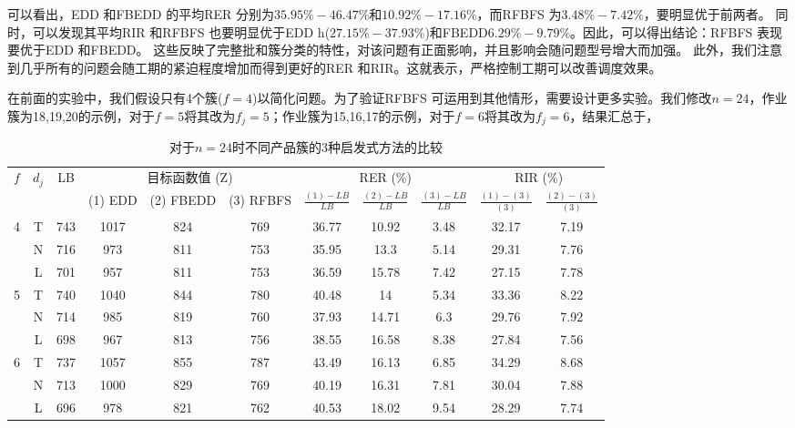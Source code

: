 可以看出，EDD 和FBEDD 的平均RER 分别为$35.95\% - 46.47\%$和$10.92\% - 17.16\%$，而RFBFS 为$3.48\% - 7.42\%$，要明显优于前两者。
同时，可以发现其平均RIR 和RFBFS 也要明显优于EDD h($27.15\% - 37.93\%$)和FBEDD$6.29\% - 9.79\%$。因此，可以得出结论：RFBFS 表现要优于EDD
 和FBEDD。
这些反映了完整批和簇分类的特性，对该问题有正面影响，并且影响会随问题型号增大而加强。
此外，我们注意到几乎所有的问题会随工期的紧迫程度增加而得到更好的RER 和RIR。这就表示，严格控制工期可以改善调度效果。

在前面的实验中，我们假设只有4个簇($f=4$)以简化问题。为了验证RFBFS 可运用到其他情形，需要设计更多实验。我们修改$n=24$，作业簇为18,19,20的示例，对于$f = 5$将其改为$f_j=5$；作业簇为15,16,17的示例，对于$f = 6$将其改为$f_j=6$，结果汇总于，
\begin{table}[h]
  \centering\xiaowu
  \caption{对于$n=24$时不同产品簇的3种启发式方法的比较\label{tab:n=24compare}}
    \begin{tabular}{ccccccccccc}
    \toprule
    \multirow{2}[4]{*}{$f$} & \multirow{2}[4]{*}{$d_j$} & \multirow{2}[4]{*}{LB} & \multicolumn{3}{c}{目标函数值 (Z)} & \multicolumn{3}{c}{RER (\%)} & \multicolumn{2}{c}{RIR (\%)} \\
    \cline{4-11}
          &       &       & (1) EDD & (2) FBEDD & (3) RFBFS & $\frac{(1) - LB}{LB}$ & $\frac{(2) - LB}{LB}$ & $\frac{(3) - LB}{LB}$ &$\frac{(1) - (3)}{(3)}$ & $\frac{(2) - (3)}{(3)}$\\
          \midrule
    \multirow{3}[1]{*}{4} & T     & 743   & 1017  & 824   & 769   & 36.77 & 10.92 & 3.48  & 32.17 & 7.19 \\
          & N     & 716   & 973   & 811   & 753   & 35.95 & 13.3  & 5.14  & 29.31 & 7.76 \\
          & L     & 701   & 957   & 811   & 753   & 36.59 & 15.78 & 7.42  & 27.15 & 7.78 \\[3pt]
    \multirow{3}[0]{*}{5} & T     & 740   & 1040  & 844   & 780   & 40.48 & 14    & 5.34  & 33.36 & 8.22 \\
          & N     & 714   & 985   & 819   & 760   & 37.93 & 14.71 & 6.3   & 29.76 & 7.92 \\
          & L     & 698   & 967   & 813   & 756   & 38.55 & 16.58 & 8.38  & 27.84 & 7.56 \\[3pt]
    \multirow{3}[1]{*}{6} & T     & 737   & 1057  & 855   & 787   & 43.49 & 16.13 & 6.85  & 34.29 & 8.68 \\
          & N     & 713   & 1000  & 829   & 769   & 40.19 & 16.31 & 7.81  & 30.04 & 7.88 \\
          & L     & 696   & 978   & 821   & 762   & 40.53 & 18.02 & 9.54  & 28.29 & 7.74 \\
    \bottomrule
    \end{tabular}
\end{table}
